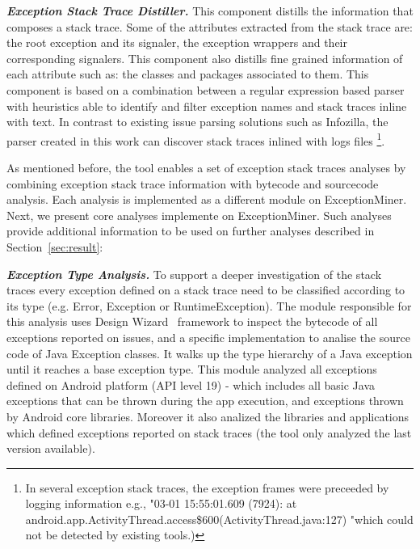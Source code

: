 \documentclass[conference]{IEEEtran}
\begin{document}
\emph{\textbf{Exception Stack Trace Distiller.}}
This component distills the information that composes a stack trace.
 Some of the attributes extracted from the stack trace are:
 the root exception and its signaler, the exception wrappers and their corresponding signalers. 
This component also distills fine grained information of each attribute such as: the classes and packages associated to them.
This component is based on a combination between a regular expression based parser 
with heuristics able to identify and filter exception names and stack traces inline with text. 
In contrast to existing issue parsing solutions such as Infozilla, the parser
created in this work can discover stack traces inlined with logs files \footnote{In several 
exception stack traces, the exception frames were preceeded by logging information e.g., 
"03-01 15:55:01.609 (7924): at android.app.ActivityThread.access\$600(ActivityThread.java:127) 
"which could not be detected by existing tools.)}.



As mentioned before, the tool enables a set of exception stack traces analyses by combining exception stack 
trace information with bytecode and sourcecode analysis. Each analysis is implemented as a different module 
on ExceptionMiner. Next, we present core analyses implemente on ExceptionMiner. Such analyses 
provide additional information to be used on further analyses described in Section~\ref{sec:result}:

\emph{\textbf{Exception Type Analysis.}} To support a deeper investigation of the 
stack traces every exception defined on a stack trace need to be classified according to its type
(e.g. Error, Exception or RuntimeException). The module responsible for this analysis 
uses Design Wizard~\cite{Brunet09} framework to inspect the bytecode of all exceptions reported on issues,
and a specific implementation to analise the source code of Java Exception classes.
It walks up the type hierarchy of a Java exception until it reaches a base exception type.
This module analyzed all exceptions defined on Android platform (API level 19) - 
which includes all basic Java exceptions that can be thrown during the app execution,
and exceptions thrown by Android core libraries. Moreover it also analized the 
libraries and applications which defined exceptions reported on stack traces
(the tool only analyzed the last version available).
\end{document}
